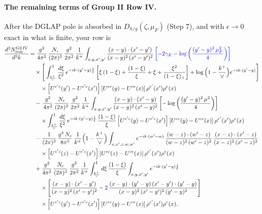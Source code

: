 \documentclass[10pt]{article}
\numberwithin{equation}{section}
\newcommand{\new}[1]{{\color{blue}#1}}
\begin{document}
\paragraph{The remaining terms of Group II Row IV.} After the DGLAP pole is absorbed in $D_{h/g}(\zeta,\mu_F)$ (Step 7), and with $\epsilon\to0$ exact in what is finite, your row is
\begin{align}
\frac{d^{3}N^{\rm G2\,IV}_{\rm rem}}{d^{3}k}  & = \frac{g^{2}}{4\pi^{2}}\,\frac{N_{c}}{(2\pi)^{3}}\,\frac{g^{2}}{2\pi^{2}}\,\frac{1}{k^{+}}\int_{x,y,x',y'}\frac{(x-y)\cdot (x'-y')}{(x-y)^{2}\,(x'-y')^{2}}\,\new{\left[-2\gamma_{E}-\log\left(\frac{(y'-y)^{2}\,\mu^{2}_{F}}{4}\right)\right]}\notag\\
&\quad\times\Bigg[\int_{\frac{k^{+}}{\vee}}^{1}\frac{d\xi}{\xi^{2}}\,e^{-ik\cdot (y'-y)\frac{1}{\xi}}\left[\xi\,(1-\xi)+\frac{(1-\xi)}{\xi}+\xi+\frac{\xi^{2}}{(1-\xi)_{+}}\right]+\log\Big(1-\frac{k^{+}}{\vee}\Big)e^{-ik\cdot(y'-y)}\Bigg]\notag\\
&\qquad\times\left[U^{e'c}(y') - U^{e'c}(x')\right] \left[U^{ec}(y) - U^{ce}(x)\right] \rho^{e'}(x') \rho^{e}(x)\notag\\
&\quad-\,\frac{g^{2}}{4\pi^{2}}\,\frac{N_{c}}{(2\pi)^{3}}\,\frac{g^{2}}{2\pi^{2}}\,\frac{1}{k^{+}}\int_{x,y,x',y'}\frac{(x-y)\cdot (x'-y)}{(x-y)^{2}\,(x'-y)^{2}}\left[-\log\left(\frac{(y'-y)^{2}\,\mu^{2}}{4}\right)\right]\notag\\
&\qquad\times\int_{\frac{k^{+}}{\vee}}^{1}\frac{d\xi}{\xi^{2}}\,e^{-ik\cdot (y'-y)\frac{1}{\xi}}\,\frac{(1-\xi)}{\xi}\left[U^{e'c}(y) - U^{e'c}(x')\right] \left[U^{ec}(y) - U^{ce}(x)\right] \rho^{e'}(x') \rho^{e}(x)\notag\\
&\quad-\frac{1}{(2\pi)^{3}}\,\frac{g^{4}\,N_{c}}{8\pi^{5}}\,\frac{1}{k^{+}}\Big(1-\frac{k^{+}}{\vee}\Big)\int_{x,x',z,w,w'}e^{-ik\cdot (w'-w)}\,\frac{(w-z)\cdot(w'-z)}{(w-z)^{2}\,(w'-z)^{2}}\,\frac{(x-z)\cdot(x'-z)}{(x-z)^{2}\,(x'-z)^{2}}\notag\\
&\qquad\times\left[U^{e'c}(z) - U^{e'c}(x')\right]\left[U^{ec}(z) - U^{ce}(x)\right] \rho^{e'}(x') \rho^{e}(x)\notag\\
&\quad+\frac{g^{2}}{4\pi^{2}}\,\frac{N_{c}}{(2\pi)^{3}}\,\frac{g^{2}}{2\pi^{2}}\,\frac{1}{k^{+}}\int_{\frac{k^{+}}{\vee}}^{1}d\xi\,\frac{(1-\xi)}{\xi}\int_{x,y,x',y'}e^{-ik\cdot (y'-y)\frac{1}{\xi}}\notag\\
&\qquad\times\Bigg[\frac{(x-y)\cdot (x'-y')}{(x-y)^{2}\,(x'-y')^{2}}-\new{2}\,\frac{(x-y)\cdot (y'-y)\,(x'-y')\cdot (y'-y)}{(x-y)^{2}\,(x'-y')^{2}\,(y'-y)^{2}}\Bigg]\notag\\
&\qquad\times\left[U^{e'c}(y') - U^{e'c}(x')\right] \left[U^{ec}(y) - U^{ce}(x)\right] \rho^{e'}(x') \rho^{e}(x).\label{eq:G2IVrem}
\end{align}
\end{document}

